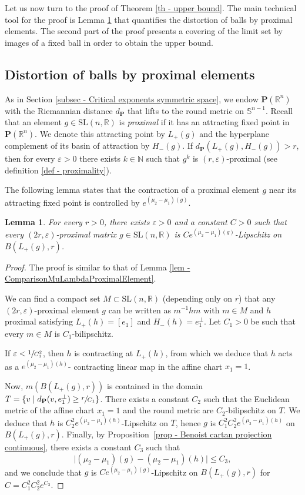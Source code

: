 \documentclass[11pt]{article}
\numberwithin{equation}{section}
\newtheorem{lemma}[theo]{Lemma}
\theoremstyle{definition}
\newcommand{\proj}{\mathbf{P}}
\newcommand{\R}{\mathbb{R}}
\newcommand{\N}{\mathbb{N}}
\newcommand{\SL}{\mathrm{SL}}
\let\epsilon\varepsilon
\begin{document}
Let us now turn to the proof of Theorem \ref{th - upper bound}. The main technical tool for the proof is Lemma \ref{lem - quantified distortion of balls by loxodromic element} that quantifies the distortion of balls by proximal elements. The second part of the proof presents a covering of the limit set by images of a fixed ball in order to obtain the upper bound.

\subsection{Distortion of balls by proximal elements}

As in Section \ref{subsec - Critical exponents symmetric space}, we endow $\proj(\R^n)$ with the Riemannian distance $d_\proj$ that lifts to the round metric on $\mathbb{S}^{n-1}$. Recall that an element $g\in\SL(n,\R)$ is \emph{proximal} if it has an attracting fixed point in $\proj(\R^n)$. We denote this attracting point by $L_+(g)$ and the hyperplane complement of its basin of attraction by $H_-(g)$. If $d_\proj(L_+(g), H_-(g)) > r$, then for every $\epsilon>0$ there exists $k \in \N$ such that $g^k$ is $(r,\epsilon)$-proximal (see definition \ref{def - proximality}).

The following lemma states that the contraction of a proximal element $g$ near its attracting fixed point is controlled by $e^{(\mu_2-\mu_1)(g)}$.

\begin{lemma}\label{lem - quantified distortion of balls by loxodromic element}
For every $r>0$, there exists $\epsilon >0$ and a constant $C>0$ such that every $(2r,\epsilon)$-proximal matrix $g\in \SL(n,\R)$ is $Ce^{(\mu_2-\mu_1)(g)}$-Lipschitz on $B(L_+(g),r)$.
\end{lemma}

\begin{proof}
The proof is similar to that of Lemma \ref{lem - ComparisonMuLambdaProximalElement}.

We can find a compact set $M \subset \SL(n,\R)$ (depending only on $r$) that any $(2r,\epsilon)$-proximal element $g$ can be written as $m^{-1}hm$ with $m\in M$ and $h$ proximal satisfying $L_+(h) = [e_1]$ and $H_-(h) = e_1^\perp$. Let $C_1>0$ be such that every $m\in M$ is $C_1$-bilipschitz.

If $\epsilon < \sfrac{1}{C_1^2}$, then $h$ is contracting at $L_+(h)$, from which we deduce that $h$ acts as a $e^{(\mu_2-\mu_1)(h)}$- contracting linear map in the affine chart $x_1=1$.

Now, $m(B(L_+(g),r))$ is contained in the domain $T = \{v \mid d_\proj(v, e_1^\perp) \geq \sfrac{r}{C_1}\}$. There exists a constant $C_2$ such that the Euclidean metric of the affine chart $x_1=1$ and the round metric are $C_2$-bilipschitz on $T$. We deduce that $h$ is $C_2^2e^{(\mu_2-\mu_1)(h)}$-Lipschitz on $T$, hence $g$ is $C_1^2 C_2^2e^{(\mu_2-\mu_1)(h)}$ on $B(L_+(g),r)$. Finally, by Proposition~\ref{prop - Benoist cartan projection continuous}, there exists a constant $C_3$ such that
\[\vert(\mu_2-\mu_1)(g)- (\mu_2-\mu_1)(h)\vert \leq C_3 ,\] and we conclude that $g$ is $Ce^{(\mu_2-\mu_1)(g)}$-Lipschitz on $B(L_+(g),r)$ for $C=C_1^2 C_2^2e^{C_3}$.
\end{proof}
\end{document}
